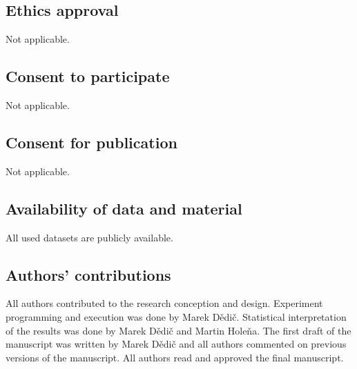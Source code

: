 \documentclass[runningheads]{llncs}
\begin{document}
\subsection*{Ethics approval}

Not applicable.

\subsection*{Consent to participate}

Not applicable.

\subsection*{Consent for publication}

Not applicable.

\subsection*{Availability of data and material}

All used datasets are publicly available.


\subsection*{Authors' contributions}

All authors contributed to the research conception and design. Experiment programming and execution was done by Marek Dědič. Statistical interpretation of the results was done by Marek Dědič and Martin Holeňa. The first draft of the manuscript was written by Marek Dědič and all authors commented on previous versions of the manuscript. All authors read and approved the final manuscript.



\end{document}
